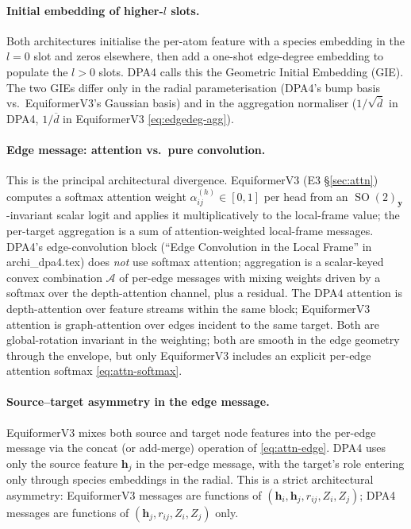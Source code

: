 \documentclass[11pt,a4paper]{article}
\DeclareMathOperator{\SO}{SO}
\newcommand{\by}{\bm{y}}
\newcommand{\bh}{\bm{h}}
\theoremstyle{plain}
\theoremstyle{definition}
\theoremstyle{remark}
\begin{document}
\paragraph{Initial embedding of higher-$l$ slots.}
Both architectures initialise the per-atom feature with a species embedding in
the $l=0$ slot and zeros elsewhere, then add a one-shot edge-degree embedding
to populate the $l>0$ slots. DPA4 calls this the Geometric Initial Embedding
(GIE). The two GIEs differ only in the radial parameterisation (DPA4's bump
basis vs.\ EquiformerV3's Gaussian basis) and in the aggregation normaliser
($1/\sqrt{\overline d}$ in DPA4, $1/\overline d$ in EquiformerV3
\eqref{eq:edgedeg-agg}).

\paragraph{Edge message: attention vs.\ pure convolution.}
This is the principal architectural divergence. EquiformerV3 (E3
\S\ref{sec:attn}) computes a softmax attention weight
$\alpha^{(h)}_{ij}\in[0,1]$ per head from an $\SO(2)_{\by}$-invariant scalar
logit and applies it multiplicatively to the local-frame value; the per-target
aggregation is a sum of attention-weighted local-frame messages. DPA4's
edge-convolution block (``Edge Convolution in the Local Frame'' in
archi\_dpa4.tex) does \emph{not} use softmax attention; aggregation is a
scalar-keyed convex combination $\mathcal{A}$ of per-edge messages with mixing
weights driven by a softmax over the depth-attention channel, plus a residual.
The DPA4 attention is depth-attention over feature streams within the same
block; EquiformerV3 attention is graph-attention over edges incident to the
same target. Both are global-rotation invariant in the weighting; both are
smooth in the edge geometry through the envelope, but only EquiformerV3
includes an explicit per-edge attention softmax \eqref{eq:attn-softmax}.

\paragraph{Source--target asymmetry in the edge message.}
EquiformerV3 mixes both source and target node features into the per-edge
message via the concat (or add-merge) operation of \eqref{eq:attn-edge}. DPA4
uses only the source feature $\bh_j$ in the per-edge message, with the target's
role entering only through species embeddings in the radial. This is a strict
architectural asymmetry: EquiformerV3 messages are functions of
$(\bh_i,\bh_j,r_{ij},Z_i,Z_j)$; DPA4 messages are functions of
$(\bh_j,r_{ij},Z_i,Z_j)$ only.
\end{document}
